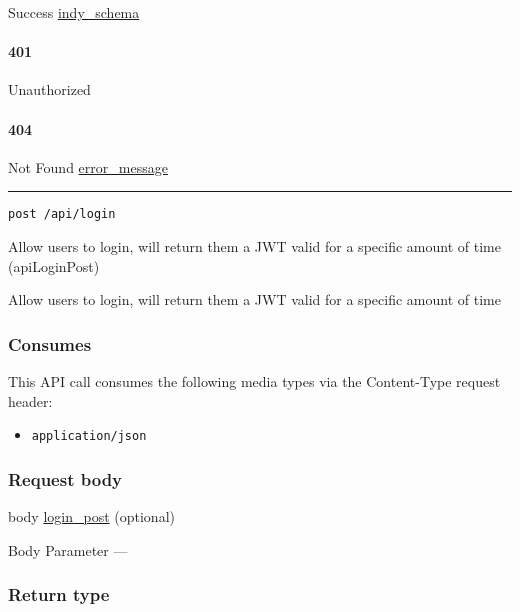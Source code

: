 Success \protect\hyperlink{indy_schema}{indy\_schema}

\hypertarget{section-247}{%
\paragraph{401}\label{section-247}}

Unauthorized \protect\hyperlink{}{}

\hypertarget{section-248}{%
\paragraph{404}\label{section-248}}

Not Found \protect\hyperlink{error_message}{error\_message}

\begin{center}\rule{0.5\linewidth}{\linethickness}\end{center}

\protect\hypertarget{apiLoginPost}{}{}

\begin{verbatim}
post /api/login
\end{verbatim}

Allow users to login, will return them a JWT valid for a specific amount
of time ({apiLoginPost})

Allow users to login, will return them a JWT valid for a specific amount
of time

\hypertarget{consumes-24}{%
\subsubsection{Consumes}\label{consumes-24}}

This API call consumes the following media types via the {Content-Type}
request header:

\begin{itemize}
\tightlist
\item
  \texttt{application/json}
\end{itemize}

\hypertarget{request-body-24}{%
\subsubsection{Request body}\label{request-body-24}}

body \protect\hyperlink{login_post}{login\_post} (optional)

{Body Parameter} ---

\hypertarget{return-type-61}{%
\subsubsection{Return type}\label{return-type-61}}

